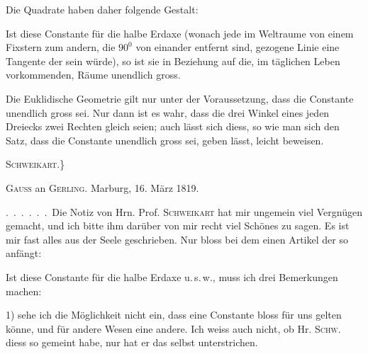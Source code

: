 Die Quadrate haben daher folgende Gestalt:

\begin{center}\end{center}

Ist diese Constante für  die halbe Erdaxe (wonach jede im Weltraume von einem Fixstern zum andern, die $90^{0}$ von einander entfernt sind, gezogene Linie eine Tangente der  sein würde), so ist sie in Beziehung auf die, im täglichen Leben vorkommenden, Räume unendlich gross.

Die Euklidische Geometrie gilt nur unter der Voraussetzung, dass die Constante unendlich gross sei. Nur dann ist es wahr, dass die drei Winkel eines jeden Dreiecks zwei Rechten gleich seien; auch lässt sich diess, so wie man sich den Satz, dass die Constante unendlich gross sei, geben lässt, leicht beweisen.

\begin{flushright}\textsc{Schweikart.}\}\end{flushright}

\bigskip
\noindent\hrulefill
\bigskip

\begin{center}
\textsc{Gauss} an \textsc{Gerling}. Marburg, 16. März 1819.
\end{center}

.\ .\ .\ .\ .\ .\ Die Notiz von Hrn. Prof. \textsc{Schweikart} hat mir ungemein viel Vergnügen gemacht, und ich bitte ihm darüber von mir recht viel Schönes zu sagen. Es ist mir fast alles aus der Seele geschrieben. Nur bloss bei dem einen Artikel der so anfängt:

Ist diese Constante für  die halbe Erdaxe u.\,s.\,w., muss ich drei Bemerkungen machen:

1) sehe ich die Möglichkeit nicht ein, dass eine Constante bloss für uns gelten könne, und für andere Wesen eine andere. Ich weiss auch nicht, ob Hr. \textsc{Schw.} diess so gemeint habe, nur hat er das  selbst unterstrichen.

